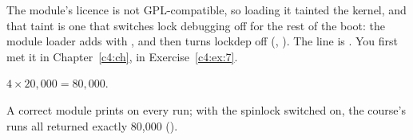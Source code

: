  The module's licence is not GPL-compatible, so loading it tainted the kernel, and that
taint is one that switches lock debugging off for the rest of the boot: the module loader adds
 with , and  then turns
lockdep off (, ). The line is
. You first met it in Chapter~\ref{c4:ch}, in
Exercise~\ref{c4:ex:7}.


 $4 \times 20{,}000 = 80{,}000$.

 A correct module prints  on every run; with the spinlock
switched on, the course's runs all returned exactly 80,000 ().

